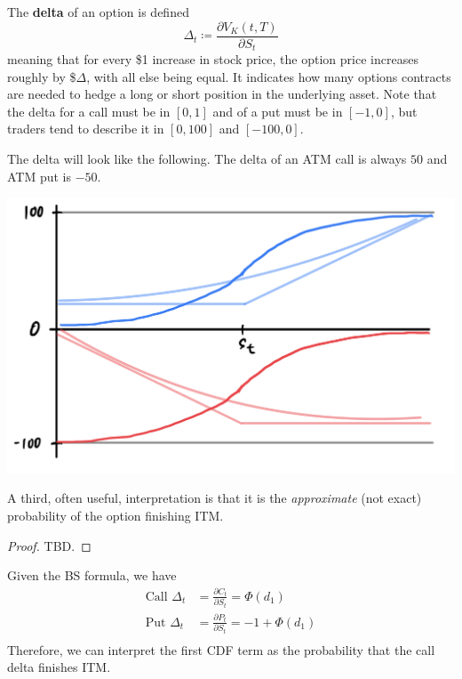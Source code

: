 \documentclass{article}
\begin{document}
    \begin{definition}[Delta]
      The \textbf{delta} of an option is defined 
      \begin{equation}
        \Delta_t \coloneqq \frac{\partial V_K (t, T)}{\partial S_t}
      \end{equation}
      meaning that for every \$1 increase in stock price, the option price increases roughly by \$$\Delta$, with all else being equal. It indicates how many options contracts are needed to hedge a long or short position in the underlying asset. Note that the delta for a call must be in $[0, 1]$ and of a put must be in $[-1, 0]$, but traders tend to describe it in $[0, 100]$ and $[-100, 0]$. 
      
      The delta will look like the following. The delta of an ATM call is always $50$ and ATM put is $-50$.
      \begin{center}
        \includegraphics[scale=0.4]{img/delta.png}
      \end{center}
    \end{definition}

    \begin{theorem}
      A third, often useful, interpretation is that it is the \textit{approximate} (not exact) probability of the option finishing ITM. 
    \end{theorem}
    \begin{proof}
      TBD. 
    \end{proof}

    \begin{theorem}
      Given the BS formula, we have 
      \begin{align}
        \text{Call } \Delta_t & = \frac{\partial C_t}{\partial S_t} = \Phi(d_1) \\
        \text{Put } \Delta_t & = \frac{\partial P_t}{\partial S_t} = - 1 + \Phi(d_1) \\
      \end{align}
      Therefore, we can interpret the first CDF term as the probability that the call delta finishes ITM. 
    \end{theorem}
\end{document}
